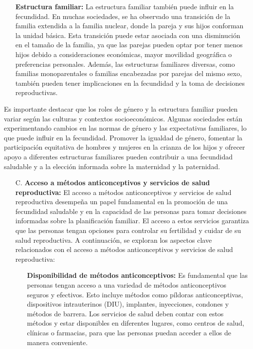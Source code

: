 \documentclass[8pt,a4paper]{beamer}
\begin{document}
{\begin{frame}{}
\begin{block}{}
\begin{enumerate}
\begin{enumerate}
\item[\ding{65}] \textbf{Estructura familiar:} La estructura familiar también puede influir en la fecundidad. En muchas sociedades, se ha observado una transición de la familia extendida a la familia nuclear, donde la pareja y sus hijos conforman la unidad básica. Esta transición puede estar asociada con una disminución en el tamaño de la familia, ya que las parejas pueden optar por tener menos hijos debido a consideraciones económicas, mayor movilidad geográfica o preferencias personales. Además, las estructuras familiares diversas, como familias monoparentales o familias encabezadas por parejas del mismo sexo, también pueden tener implicaciones en la fecundidad y la toma de decisiones reproductivas.
\end{enumerate}
Es importante destacar que los roles de género y la estructura familiar pueden variar según las culturas y contextos socioeconómicos. Algunas sociedades están experimentando cambios en las normas de género y las expectativas familiares, lo que puede influir en la fecundidad. Promover la igualdad de género, fomentar la participación equitativa de hombres y mujeres en la crianza de los hijos y ofrecer apoyo a diferentes estructuras familiares pueden contribuir a una fecundidad saludable y a la elección informada sobre la maternidad y la paternidad.
\end{enumerate}
\end{block}
\end{frame}

\begin{frame}{}
\begin{block}{}
\setlength{\parskip}{3px}
\justifying
\begin{enumerate}
\setlength{\parskip}{3px}
\justifying
\item[C.] \textbf{Acceso a métodos anticonceptivos y servicios de salud reproductiva:} El acceso a métodos anticonceptivos y servicios de salud reproductiva desempeña un papel fundamental en la promoción de una fecundidad saludable y en la capacidad de las personas para tomar decisiones informadas sobre la planificación familiar. El acceso a estos servicios garantiza que las personas tengan opciones para controlar su fertilidad y cuidar de su salud reproductiva. A continuación, se exploran los aspectos clave relacionados con el acceso a métodos anticonceptivos y servicios de salud reproductiva:
\begin{enumerate}
\setlength{\parskip}{3px}
\justifying
\item[\ding{65}] \textbf{Disponibilidad de métodos anticonceptivos:} Es fundamental que las personas tengan acceso a una variedad de métodos anticonceptivos seguros y efectivos. Esto incluye métodos como píldoras anticonceptivas, dispositivos intrauterinos (DIU), implantes, inyecciones, condones y métodos de barrera. Los servicios de salud deben contar con estos métodos y estar disponibles en diferentes lugares, como centros de salud, clínicas o farmacias, para que las personas puedan acceder a ellos de manera conveniente.


\end{enumerate}
\end{enumerate}
\end{block}
\end{frame}}
\end{document}
